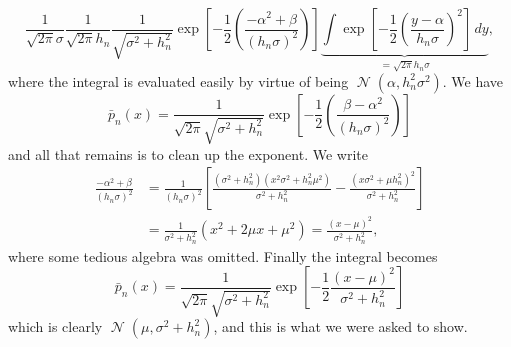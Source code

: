 \documentclass[12pt, a4paper]{article}
\DeclareMathOperator{\N}{\mathcal{N}}
\begin{document}
\begin{easylist}[enumerate]
	\begin{equation*}
	\frac{1}{\sqrt{2 \pi} \sigma}
	\frac{1}{\sqrt{2 \pi} h_n} \frac{1}{\sqrt{\sigma^2 + h_n^2}}
	\exp \left[ -\frac{1}{2} \left( \frac{-\alpha^2 + \beta}{(h_n \sigma)^2}
	\right) \right]
	\underbrace{\int \exp \left[ 
	-\frac{1}{2} \left( \frac{y - \alpha}{h_n \sigma}
	\right)^2 \right]
	 \, dy}_{= \sqrt{2 \pi} h_n \sigma},
	\end{equation*}
	where the integral is evaluated easily by virtue of being $\N(\alpha, h_n^2 \sigma^2)$. 
	We have
	\begin{equation*}
	\bar{p}_n(x) = 	 \frac{1}{ \sqrt{2 \pi} \sqrt{\sigma^2 + h_n^2}}
	\exp \left[ -\frac{1}{2} \left( \frac{ \beta - \alpha^2}{(h_n \sigma)^2}
	\right) \right]
	\end{equation*}
	and all that remains is to clean up the exponent.
	We write
	\begin{align*}
		\frac{-\alpha^2 + \beta}{(h_n \sigma)^2}
		& = \frac{1}{(h_n \sigma)^2}
		\left[
		\frac{(\sigma^2 + h_n^2) \left( x^2 \sigma^2 + h_n^2 \mu^2 \right)}{\sigma^2 + h_n^2}
		-
		\frac{\left( x \sigma^2 + \mu h_n^2 \right)^2}{\sigma^2 + h_n^2}
		\right] \\
		&= \frac{1}{\sigma^2 + h_n^2} \left( x^2 + 2\mu x + \mu^2 \right)
		= \frac{\left( x - \mu \right)^2}{\sigma^2 + h_n^2} ,
	\end{align*}
	where some tedious algebra was omitted.
	Finally the integral becomes
	\begin{equation*}
	\bar{p}_n(x) = \frac{1}{\sqrt{2 \pi} \sqrt{\sigma^2 + h_n^2}} 
	\exp \left[ -\frac{1}{2} \frac{\left( x - \mu \right)^2}{\sigma^2 + h_n^2} \right]
	\end{equation*}
	which is clearly $\N(\mu, \sigma^2 + h_n^2)$, and this is what we were asked to show.
	
\end{easylist}
\end{document}
